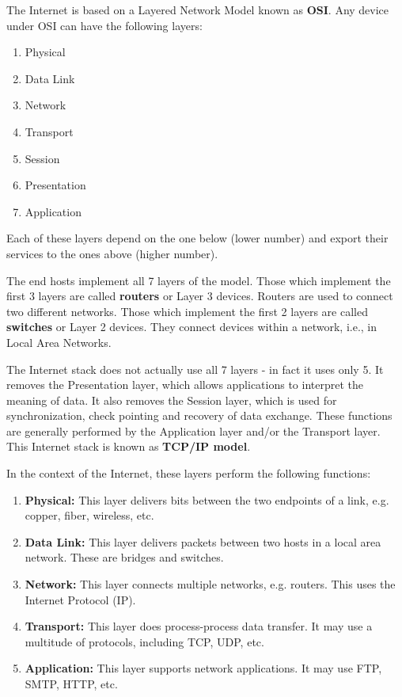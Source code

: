 \documentclass[12pt,letterpaper]{article}
\theoremstyle{definition}
\begin{document}
The Internet is based on a Layered Network Model known as \textbf{OSI}. Any device under OSI can have the following layers:

\begin{enumerate}
  \item Physical
  \item Data Link
  \item Network
  \item Transport
  \item Session
  \item Presentation
  \item Application
\end{enumerate}

Each of these layers depend on the one below (lower number) and export their services to the ones above (higher number).

The end hosts implement all 7 layers of the model. Those which implement the first 3 layers are called \textbf{routers} or Layer 3 devices. Routers are used to connect two different networks. Those which implement the first 2 layers are called \textbf{switches} or Layer 2 devices. They connect devices within a network, i.e., in Local Area Networks.

The Internet stack does not actually use all 7 layers - in fact it uses only 5. It removes the Presentation layer, which allows applications to interpret the meaning of data. It also removes the Session layer, which is used for synchronization, check pointing and recovery of data exchange. These functions are generally performed by the Application layer and/or the Transport layer. This Internet stack is known as \textbf{TCP/IP model}.

In the context of the Internet, these layers perform the following functions:

\begin{enumerate}
  \item \textbf{Physical:} This layer delivers bits between the two endpoints of a link, e.g. copper, fiber, wireless, etc.
  \item \textbf{Data Link:} This layer delivers packets between two hosts in a local area network. These are bridges and switches.
  \item \textbf{Network:} This layer connects multiple networks, e.g. routers. This uses the Internet Protocol (IP).
  \item \textbf{Transport:} This layer does process-process data transfer. It may use a multitude of protocols, including TCP, UDP, etc.
  \item \textbf{Application:} This layer supports network applications. It may use FTP, SMTP, HTTP, etc.
\end{enumerate}
\end{document}

